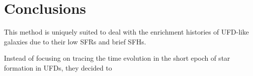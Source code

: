 \section {Conclusions}
\label{conc}

This method is uniquely suited to deal with the enrichment histories of UFD-like galaxies due to their low SFRs and brief SFHs. 

Instead of focusing on tracing the time evolution in the short epoch of star formation in UFDs, they decided to 

